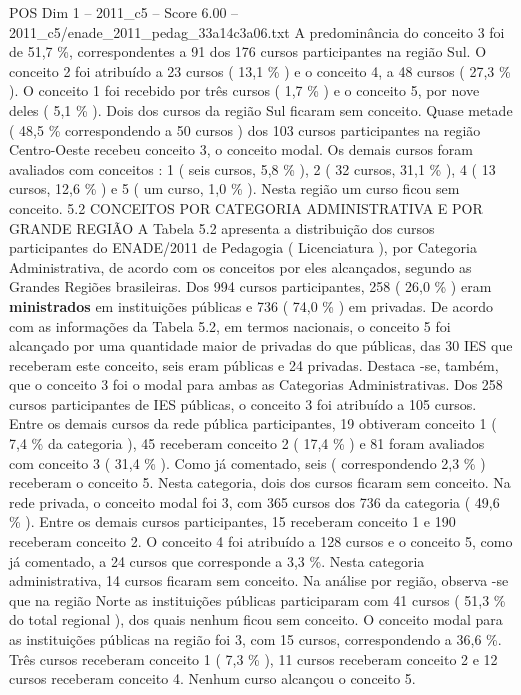 \begin{textsample}{POS Dim 1 – 2011\_c5 – Score 6.00 – 2011\_c5/enade\_2011\_pedag\_33a14c3a06.txt}
A predominância do conceito 3 foi de 51,7 \%, correspondentes a 91 dos 176 cursos participantes na região Sul.
O conceito 2 foi atribuído a 23 cursos ( 13,1 \% ) e o conceito 4, a 48 cursos ( 27,3 \% ).
O conceito 1 foi recebido por três cursos ( 1,7 \% ) e o conceito 5, por nove deles ( 5,1 \% ).
Dois dos cursos da região Sul ficaram sem conceito.
Quase metade ( 48,5 \% correspondendo a 50 cursos ) dos 103 cursos participantes na região Centro-Oeste recebeu conceito 3, o conceito modal.
Os demais cursos foram avaliados com conceitos : 1 ( seis cursos, 5,8 \% ), 2 ( 32 cursos, 31,1 \% ), 4 ( 13 cursos, 12,6 \% ) e 5 ( um curso, 1,0 \% ).
Nesta região um curso ficou sem conceito. 5.2 CONCEITOS POR CATEGORIA ADMINISTRATIVA E POR GRANDE REGIÃO A Tabela 5.2 apresenta a distribuição dos cursos participantes do ENADE/2011 de Pedagogia ( Licenciatura ), por Categoria Administrativa, de acordo com os conceitos por eles alcançados, segundo as Grandes Regiões brasileiras.
Dos 994 cursos participantes, 258 ( 26,0 \% ) eram \textbf{ministrados} em instituições públicas e 736 ( 74,0 \% ) em privadas.
De acordo com as informações da Tabela 5.2, em termos nacionais, o conceito 5 foi alcançado por uma quantidade maior de privadas do que públicas, das 30 IES que receberam este conceito, seis eram públicas e 24 privadas.
Destaca -se, também, que o conceito 3 foi o modal para ambas as Categorias Administrativas.
Dos 258 cursos participantes de IES públicas, o conceito 3 foi atribuído a 105 cursos.
Entre os demais cursos da rede pública participantes, 19 obtiveram conceito 1 ( 7,4 \% da categoria ), 45 receberam conceito 2 ( 17,4 \% ) e 81 foram avaliados com conceito 3 ( 31,4 \% ).
Como já comentado, seis ( correspondendo 2,3 \% ) receberam o conceito 5.
Nesta categoria, dois dos cursos ficaram sem conceito.
Na rede privada, o conceito modal foi 3, com 365 cursos dos 736 da categoria ( 49,6 \% ).
Entre os demais cursos participantes, 15 receberam conceito 1 e 190 receberam conceito 2.
O conceito 4 foi atribuído a 128 cursos e o conceito 5, como já comentado, a 24 cursos que corresponde a 3,3 \%.
Nesta categoria administrativa, 14 cursos ficaram sem conceito.
Na análise por região, observa -se que na região Norte as instituições públicas participaram com 41 cursos ( 51,3 \% do total regional ), dos quais nenhum ficou sem conceito.
O conceito modal para as instituições públicas na região foi 3, com 15 cursos, correspondendo a 36,6 \%.
Três cursos receberam conceito 1 ( 7,3 \% ), 11 cursos receberam conceito 2 e 12 cursos receberam conceito 4.
Nenhum curso alcançou o conceito 5.

\end{textsample}
